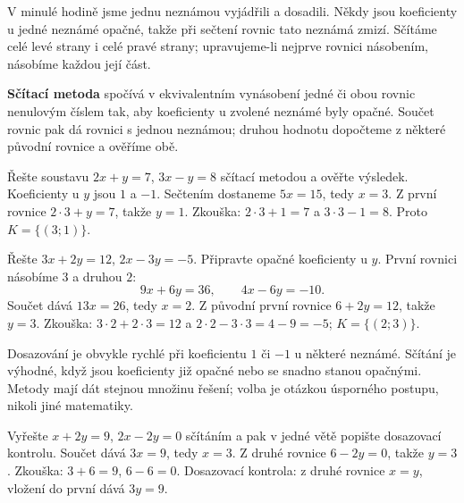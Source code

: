 \documentclass[11pt,a4paper]{article}
\begin{document}
V minulé hodině jsme jednu neznámou vyjádřili a dosadili. Někdy jsou koeficienty u jedné neznámé opačné, takže při sečtení rovnic tato neznámá zmizí. Sčítáme celé levé strany i celé pravé strany; upravujeme-li nejprve rovnici násobením, násobíme každou její část.
\begin{definiceBox}
\textbf{Sčítací metoda} spočívá v ekvivalentním vynásobení jedné či obou rovnic nenulovým číslem tak, aby koeficienty u zvolené neznámé byly opačné. Součet rovnic pak dá rovnici s jednou neznámou; druhou hodnotu dopočteme z některé původní rovnice a ověříme obě.
\end{definiceBox}
\begin{prikladReseniBox}
Řešte soustavu $2x+y=7$, $3x-y=8$ sčítací metodou a ověřte výsledek.
\tcblower
Koeficienty u $y$ jsou $1$ a $-1$. Sečtením dostaneme $5x=15$, tedy $x=3$. Z první rovnice $2\cdot3+y=7$, takže $y=1$. Zkouška: $2\cdot3+1=7$ a $3\cdot3-1=8$. Proto $K=\{(3;1)\}$.
\end{prikladReseniBox}
\begin{prikladReseniBox}
Řešte $3x+2y=12$, $2x-3y=-5$. Připravte opačné koeficienty u $y$.
\tcblower
První rovnici násobíme $3$ a druhou $2$:
\[
9x+6y=36,\qquad 4x-6y=-10.
\]
Součet dává $13x=26$, tedy $x=2$. Z původní první rovnice $6+2y=12$, takže $y=3$. Zkouška: $3\cdot2+2\cdot3=12$ a $2\cdot2-3\cdot3=4-9=-5$; $K=\{(2;3)\}$.
\end{prikladReseniBox}
Dosazování je obvykle rychlé při koeficientu $1$ či $-1$ u některé neznámé. Sčítání je výhodné, když jsou koeficienty již opačné nebo se snadno stanou opačnými. Metody mají dát stejnou množinu řešení; volba je otázkou úsporného postupu, nikoli jiné matematiky.
\begin{prikladReseniBox}
Vyřešte $x+2y=9$, $2x-2y=0$ sčítáním a pak v jedné větě popište dosazovací kontrolu.
\tcblower
Součet dává $3x=9$, tedy $x=3$. Z druhé rovnice $6-2y=0$, takže $y=3$. Zkouška: $3+6=9$, $6-6=0$. Dosazovací kontrola: z druhé rovnice $x=y$, vložení do první dává $3y=9$.
\end{prikladReseniBox}
\newpage
{}
\end{document}
